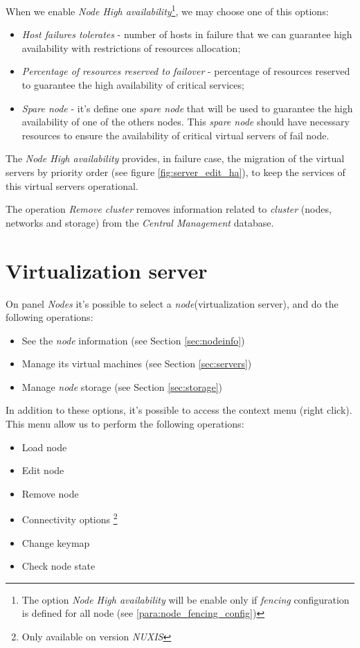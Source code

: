 When we enable \emph{Node High availability}\footnote{The option \emph{Node High availability} will be enable only if \emph{fencing} configuration is defined for all node (see \ref{para:node_fencing_config})}, we may choose one of this options:

\begin{itemize}
    \item \emph{Host failures tolerates} - number of hosts in failure that we can guarantee high availability with restrictions of resources allocation;
    \item \emph{Percentage of resources reserved to failover} - percentage of resources reserved to guarantee the high availability of critical services;
    \item \emph{Spare node} - it's define one \emph{spare node} that will be used to guarantee the high availability of one of the others nodes. This \emph{spare node} should have necessary resources to ensure the availability of critical virtual servers of fail node.
\end{itemize}

The \emph{Node High availability} provides, in failure case, the migration of the virtual servers by priority order (see figure \ref{fig:server_edit_ha}), to keep the services of this virtual servers operational.

The operation \emph{Remove cluster} removes information related to \emph{cluster} (nodes, networks and storage) from the \emph{Central Management} database.


\section{Virtualization server}
\label{sec:node}

On panel \emph{Nodes} it's possible to select a \emph{node}(virtualization server), and do the following operations:
\begin{itemize}
    \item See the \emph{node} information (see Section \ref{sec:nodeinfo})
    \item Manage its virtual machines (see Section \ref{sec:servers})
    \item Manage \emph{node} storage (see Section  \ref{sec:storage})
\end{itemize}

In addition to these options, it's possible to access the context menu (right click). This menu allow us to perform the following operations:
\begin{itemize}
    \item Load node
    \item Edit node
    \item Remove node
    \item Connectivity options \footnote{Only available on version \emph{NUXIS}}
    \item Change keymap
    \item Check node state
\end{itemize}

